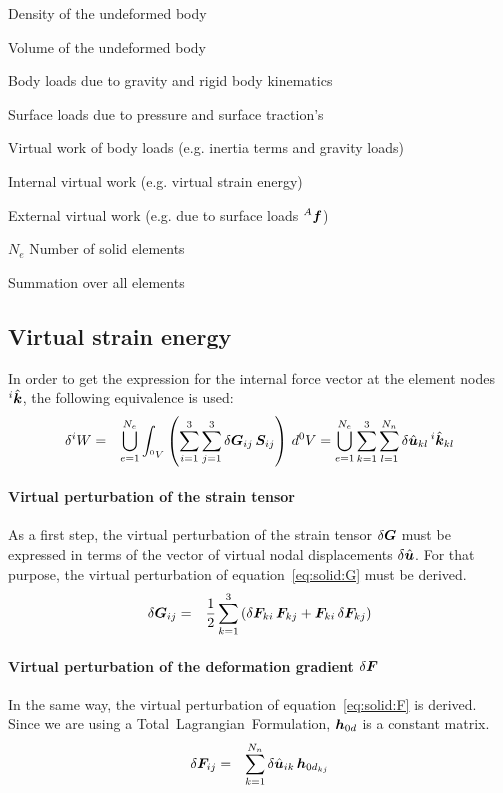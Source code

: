 \begin{description}
\item[${^0}\rho$] Density of the undeformed body
\item[${^0}V$] Volume of the undeformed body
\item[$\T{b}$] Body loads due to gravity and rigid body kinematics
\item[${^A}\T{f}$] Surface loads due to pressure and surface traction's
\item[${^m}W$] Virtual work of body loads (e.g. inertia terms and gravity loads)
\item[${^i}W$] Internal virtual work (e.g. virtual strain energy)
\item[${^e}W$] External virtual work (e.g. due to surface loads ${^A}\T{f}$)
\item{$N_e$} Number of solid elements
\item[$\bigcup$] Summation over all elements
\end{description}

\subsection{Virtual strain energy}
In order to get the expression for the internal force vector at the element nodes $^i\hat{\bm{k}}$, the following equivalence is used:
\begin{eqnarray}
\delta ^iW & = & \bigcup_{e=1}^{N_e} \int_{^0V} \left(\sum_{i=1}^3\sum_{j=1}^3 \delta \bm{G}_{ij} \, \bm{S}_{ij} \right) \, d^0V = \bigcup_{e=1}^{N_e}\sum_{k=1}^{3} \sum_{l=1}^{N_n} \delta \hat{\bm{u}}_{kl} \, ^i\hat{\bm{k}}_{kl} \label{eq:solid:deltaWi}
\end{eqnarray}

\paragraph{Virtual perturbation of the strain tensor}
As a first step, the virtual perturbation of the strain tensor $\delta\bm{G}$ must be expressed in terms of the vector of virtual nodal displacements $\delta\hat{\bm{u}}$.
For that purpose, the virtual perturbation of equation~\ref{eq:solid:G} must be derived.
\begin{eqnarray}
\delta \bm{G}_{ij} & = & \frac{1}{2} \sum_{k=1}^3\left(\delta \bm{F}_{ki} \, \bm{F}_{kj} + \bm{F}_{ki} \, \delta \bm{F}_{kj}\right) \label{eq:solid:deltaG}
\end{eqnarray}

\paragraph{Virtual perturbation of the deformation gradient $\delta\bm{F}$}
In the same way, the virtual perturbation of equation~\ref{eq:solid:F} is derived.
Since we are using a Total~Lagrangian~Formulation, $\bm{h}_{0d}$ is a constant matrix.
\begin{eqnarray}
\delta \bm{F}_{ij} & = & \sum_{k=1}^{N_n} \delta \hat{\bm{u}}_{ik} \, \bm{h}_{0d_{kj}} \label{eq:solid:deltaF}
\end{eqnarray}

